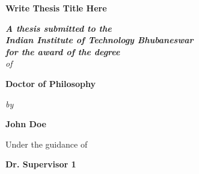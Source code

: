 \begin{titlepage}
\begin{center}

{\color{titlecolor}\LARGE \bfseries Write Thesis Title Here}\\
\vspace*{1cm}

{\large \bfseries \itshape A thesis submitted to the\\
Indian Institute of Technology Bhubaneswar\\
for the award of the degree}\\
\vspace*{0.5cm}
{\large \itshape {of}}\\
\vspace*{0.5cm}

{\selectfont
\huge \bfseries Doctor of Philosophy}\\
\vspace*{0.5cm}

{\large \itshape {by}}\\
\vspace*{0.5cm}

{\color{authorcolor}\Large \bfseries John Doe \\}
\vspace*{0.5cm}

{\large Under the guidance of\\}
\vspace*{0.2cm}

{\Large \bfseries Dr. Supervisor 1\\}


\vspace*{1.0cm}


\end{center}
\end{titlepage}
